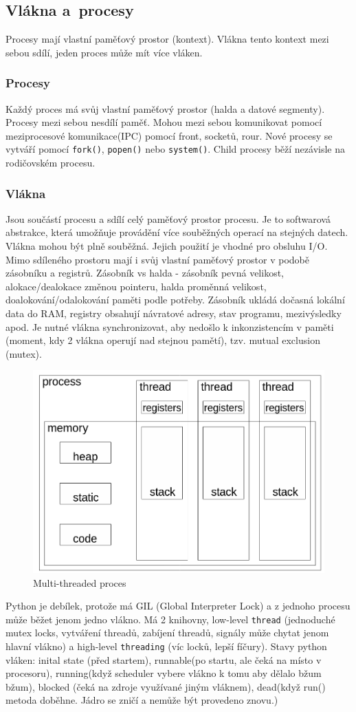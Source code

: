 \subsection{Vlákna a~procesy}
Procesy mají vlastní paměťový prostor (kontext). Vlákna tento kontext mezi sebou sdílí, jeden proces může mít více vláken.

\subsubsection{Procesy}
Každý proces má svůj vlastní paměťový prostor (halda a datové segmenty). Procesy mezi sebou nesdílí paměť. Mohou mezi sebou komunikovat pomocí meziprocesové komunikace(IPC) pomocí front, socketů, rour.  Nové procesy se vytváří pomocí \texttt{fork()}, \texttt{popen()} nebo \texttt{system()}. Child procesy běží nezávisle na rodičovském procesu.

\subsubsection{Vlákna}
Jsou součástí procesu a sdílí celý paměťový prostor procesu. Je to softwarová abstrakce, která umožňuje provádění více souběžných operací na stejných datech. Vlákna mohou být plně souběžná. 
Jejich použití je vhodné pro obsluhu I/O. Mimo sdíleného prostoru mají i svůj vlastní paměťový prostor v podobě zásobníku a registrů. Zásobník vs halda - zásobník pevná velikost, alokace/dealokace změnou pointeru, halda proměnná velikost, doalokování/odalokování paměti podle potřeby. Zásobník ukládá dočasná lokální data do RAM, registry obsahují návratové adresy, stav programu, mezivýsledky apod. Je nutné vlákna synchronizovat, aby nedošlo k inkonzistencím v paměti (moment, kdy 2 vlákna operují nad stejnou pamětí), tzv. mutual exclusion (mutex).
\begin{figure}[ht]
    \centering
    \includegraphics[width=0.5\linewidth]{pict/multithread.png}
    \caption{Multi-threaded proces}
\end{figure}

Python je debílek, protože má GIL (Global Interpreter Lock) a z jednoho procesu může běžet jenom jedno vlákno. Má 2 knihovny, low-level \texttt{thread} (jednoduché mutex locks, vytváření threadů, zabíjení threadů, signály může chytat jenom hlavní vlákno) a high-level \texttt{threading} (víc locků, lepší fíčury). Stavy python vláken: inital state (před startem), runnable(po startu, ale čeká na místo v procesoru), running(když scheduler vybere vlákno k tomu aby dělalo bžum bžum), blocked (čeká na zdroje využívané jiným vláknem), dead(když run() metoda doběhne. Jádro se zničí a nemůže být provedeno znovu.)

